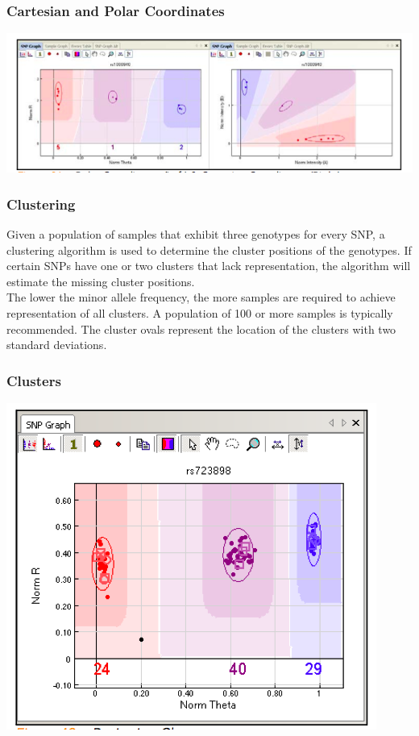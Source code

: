 \documentclass[pdf]{beamer}
\begin{document}
\begin{frame}
\frametitle{Cartesian and Polar Coordinates}
\begin{center}
\includegraphics[scale=0.45]{Figures/car_polar.png} 
\end{center}
\end{frame}

\begin{frame}
\frametitle{Clustering}
Given a population of samples that exhibit three genotypes for every SNP, a clustering algorithm is used to determine the cluster positions of the genotypes. If certain SNPs have one or two clusters that lack representation, the algorithm will estimate the missing cluster positions.\\
\vspace{0.2in}
The lower the minor allele frequency, the more samples are required to achieve representation of all clusters. A population of 100 or more samples is typically recommended.
\vspace{0.2in}
The cluster ovals represent the location of the clusters with two standard deviations.
\end{frame}

\begin{frame}
\frametitle{Clusters}
\begin{center}
\includegraphics[scale=0.5]{Figures/Clusters.png} 
\end{center}
\end{frame}
\end{document}
